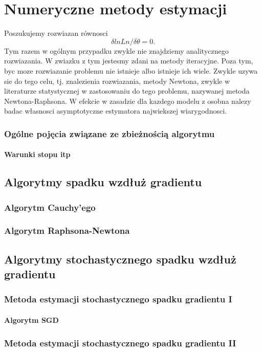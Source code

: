 \chapter{Numeryczne metody estymacji}
Poszukujemy rozwiazan równosci
$$ \delta ln Ln  / \delta \theta =  0.$$
Tym razem w ogólnym przypadku zwykle nie znajdziemy analitycznego rozwiazania. W
zwiazku z tym jestesmy zdani na metody iteracyjne. Poza tym, byc moze rozwiazanie problemu
nie istnieje albo istnieje ich wiele. Zwykle uzywa sie do tego celu, tj. znalezienia
rozwiazania, metody Newtona, zwykle w literaturze statystycznej w zastosowaniu do tego
problemu, nazywanej metoda Newtona-Raphsona. W efekcie w zasadzie dla kazdego modelu
z osobna nalezy badac własnosci asymptotyczne estymatora najwiekszej wiarygodnosci.
\subsection{Ogólne pojęcia związane ze zbieżnością algorytmu}
\subsubsection{Warunki stopu itp}
\section{Algorytmy spadku wzdłuż gradientu}
\subsection{Algorytm Cauchy'ego}
\subsection{Algorytm Raphsona-Newtona}\label{R-N}
\section{Algorytmy stochastycznego spadku wzdłuż gradientu}\label{SGD}
\subsection{Metoda estymacji stochastycznego spadku gradientu I}
\subsubsection{Algorytm SGD}
\subsection{Metoda estymacji stochastycznego spadku gradientu II}
